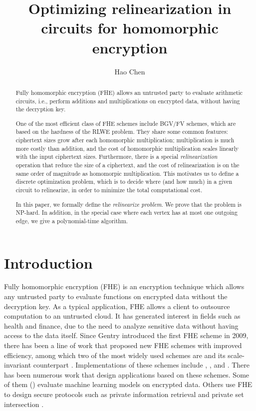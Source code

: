 \documentclass[11pt]{article} %
\title{Optimizing relinearization in circuits for homomorphic encryption}
\author[]{Hao Chen}
\affil[]{Microsoft Research \\
\texttt{haoche@microsoft.com}}
\date{}
\theoremstyle{plain}
\theoremstyle{definition}
\begin{document}
\maketitle  %


\begin{abstract}
Fully homomorphic encryption (FHE) allows an untrusted party to evaluate arithmetic circuits,  i.e., perform additions and multiplications on encrypted data, without having the decryption key. 


One of the most efficient class of FHE schemes include BGV/FV schemes, which are based on the hardness of the RLWE problem. They share some common features: ciphertext sizes grow after each homomorphic multiplication; multiplication is much more costly than addition, and the cost of homomorphic multiplication scales linearly with the input ciphertext sizes. Furthermore, there is a special {\it relinearization} operation that reduce the size of a ciphertext, and the cost of relinearization is on the same order of magnitude as homomorpic multiplication. This motivates us to define a discrete optimization problem, which is to decide where (and how much) in a given circuit to relinearize,  in order to minimize the total computational cost. 

In this paper, we formally define the {\it relinearize problem}. We prove that the problem is NP-hard. In addition, in the special case where each vertex has at most one outgoing edge, we give a polynomial-time algorithm. 
\end{abstract}

\section{Introduction}

Fully homomorphic encryption (FHE) is an encryption technique which allows any untrusted party to evaluate functions on encrypted data without the decryption key.  As a typical application, FHE allows a client to outsource computation to an untrusted cloud. It has generated interest in fields such as health and finance, due to the need to analyze sensitive data without having access to the data itself. Since Gentry introduced the first FHE scheme in 2009, there has been a line of work that proposed new FHE schemes with improved efficiency, among which two of the most widely used schemes are \cite{brakerski2014leveled} and its scale-invariant counterpart \cite{fan2012somewhat}. Implementations of these schemes include \cite{halevi2014algorithms}, \cite{chensimple}, and \cite{aguilar2016nfllib}. There has been numerous work that design applications based on these schemes. Some of them (\cite{gilad2016cryptonets,bos2017privacy}) evaluate machine learning models on encrypted data. Others use FHE to design secure protocols such as private information retrieval \cite{melchor2016xpir} and private set intersection \cite{chen2017fast}.
\end{document}
